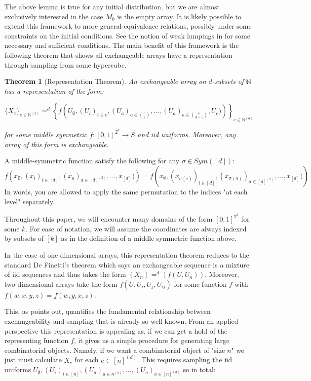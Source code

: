 \documentclass[11pt,oneside,reqno]{article}
\theoremstyle{plain}
\newtheorem{theorem}{Theorem}[section]
\theoremstyle{definition}
\numberwithin{equation}{section}
\renewcommand{\cite}{\citet}
\newcommand{\N}{\mathbb{N}}
\begin{document}
\noindent The above lemma is true for any initial distribution, but we are almost exclusively interested in the case $M_0$ is the empty array.  It is likely possible to extend this framework to more general equivalence relations, possibly under some constraints on the initial conditions. See the notion of weak lumpings in \cite{Pang2019Lumpings} for some necessary and sufficient conditions.
%
\noindent The main benefit of this framework is the following theorem that shows all exchangeable arrays have a representation through sampling from some hypercube. 


\begin{theorem}[Representation Theorem]
\noindent An exchangeable array on $d$-subsets of $\N$ has a representation of the form:

\[\{X_e\}_{e \in \N^{(d)}} =^d \left\{f\left(U_\emptyset, (U_i)_{i \in e}, (U_a)_{a \in {e \choose 2}}, ..., (U_a)_{a \in {e \choose d-1}}, U_e)\right) \right\}_{e \in \N^{(d)}}\]

\noindent for some middle symmetric $f:[0,1]^{2^d} \to S$ and iid uniforms. Moreover, any array of this form is exchangeable.

\label{thm:representation_theorem_of_exchangeable_arrays}
\end{theorem}

\noindent A middle-symmetric function satisfy the following for any $\sigma \in Sym([d])$:
%
    \[f\left(x_\emptyset, (x_i)_{i \in [d]}, (x_a)_{a \in [d]^{(2)}}, ..., x_{[d]})\right) = f\left(x_\emptyset, (x_{\sigma(i)})_{i \in [d]}, (x_{\sigma(a)})_{a \in [d]^{(2)}}, ...,  x_{[d]})\right)\]
%
In words, you are allowed to apply the same permutation to the indices "at each level" separately. 

Throughout this paper, we will encounter many domains of the form $[0,1]^{2^k}$ for some $k$. For ease of notation, we will assume the coordinates are always indexed by subsets of $[k]$ as in the definition of a middle symmetric function above.

In the case of one dimensional arrays, this representation theorem reduces to the standard De Finetti's theorem which says an exchangeable sequence is a mixture of iid sequences and thus takes the form $(X_n) =^d (f(U, U_n))$. Moreover, two-dimensional arrays take the form $f(U, U_i, U_j, U_{ij})$ for some function $f$ with $f(w,x,y,z) = f(w,y,x,z)$. 

This, as \cite{aldous2010_more_uses_of_exchangeability} points out, quantifies the fundamental relationship between exchangeability and sampling that is already so well known. From an applied perspective this representation is appealing as, if we can get a hold of the representing function $f$, it gives us a simple procedure for generating large combinatorial objects. Namely, if we want a combinatorial object of "size $n$" we just must calculate $X_e$ for each $e \in [n]^{(d)}$. This requires sampling the iid uniforms $U_\emptyset, (U_i)_{i \in [n]}, (U_a)_{a \in n^{(2)}}, ..., (U_a)_{a \in [n]^{(d)}}$ so in total:
\end{document}
